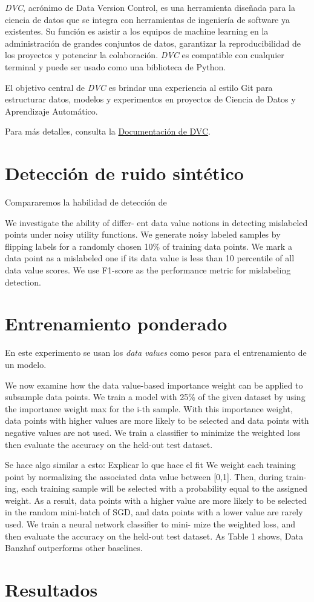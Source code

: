 \textit{DVC}, acrónimo de Data Version Control, es una
herramienta diseñada para la ciencia de datos que se
integra con herramientas de ingeniería de software ya
existentes. Su función es asistir a los equipos de machine
learning en la administración de grandes conjuntos de datos,
garantizar la reproducibilidad de los proyectos y potenciar
la colaboración. \textit{DVC} es compatible con cualquier
terminal y puede ser usado como una biblioteca
de Python.

El objetivo central de \textit{DVC} es brindar una experiencia
al estilo Git para estructurar datos, modelos y experimentos en
proyectos de Ciencia de Datos y Aprendizaje Automático.

Para más detalles, consulta la
\href{https://dvc.org/doc/user-guide}{Documentación de DVC}.

\section{Detección de ruido sintético}
Compararemos la habilidad de detección de

We investigate the ability of differ-
ent data value notions in detecting mislabeled points under
noisy utility functions. We generate noisy labeled samples
by flipping labels for a randomly chosen 10\% of training
data points. We mark a data point as a mislabeled one if its
data value is less than 10 percentile of all data value scores.
We use F1-score as the performance metric for mislabeling
detection.

\section{Entrenamiento ponderado}
En este experimento se usan los \textit{data values}
como pesos para el entrenamiento de un modelo.



We now examine how the data value-based importance
weight can be applied to subsample data points. We
train a model with 25\% of the given dataset by using
the importance weight max for
the i-th sample. With this importance weight, data
points with higher values are more likely to be selected
and data points with negative values are not used. We
train a classifier to minimize the weighted loss then
evaluate the accuracy on the held-out test dataset.

Se hace algo similar a esto: Explicar lo que hace el fit
We weight each training point by normalizing
the associated data value between [0,1]. Then, during train-
ing, each training sample will be selected with a probability
equal to the assigned weight. As a result, data points with
a higher value are more likely to be selected in the random
mini-batch of SGD, and data points with a lower value are
rarely used. We train a neural network classifier to mini-
mize the weighted loss, and then evaluate the accuracy on
the held-out test dataset. As Table 1 shows, Data Banzhaf
outperforms other baselines.

\section{Resultados}


